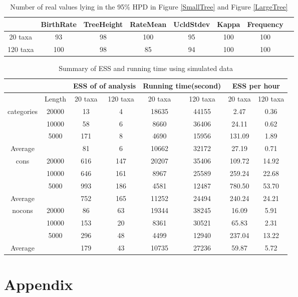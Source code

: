 \documentclass{bmcart}
\begin{document}
\begin{backmatter}
\begin{table}[h!]
  \centering
\begin{tabular}{cccccccc}
\hline
&BirthRate&TreeHeight&RateMean&UcldStdev&Kappa&Frequency\\
\hline
20 taxa&93&98&100&95&100&100\\
120 taxa&100&98&85&94&100&100\\
\hline
\end{tabular}
\caption{Number of real values lying in the 95\% HPD in Figure \ref{SmallTree} and Figure \ref{LargeTree} }\label{num_hpd}
\end{table}

\begin{table}[h!]
  \centering
\begin{tabular}{cc|cc|cc|cc}
\hline
&&\multicolumn{2}{c|}{ESS of of analysis}&\multicolumn{2}{c|}{Running time(second)}&\multicolumn{2}{c}{ESS per hour}\\
\hline
&Length&20 taxa&120 taxa&20 taxa&120 taxa&20 taxa&120 taxa\\
categories&20000&13&4&18635&44155&2.47&0.36\\
&10000&58&6&8660&36406&24.11&0.62\\
&5000&171&8&4690&15956&131.09&1.89\\
Average&&81&6&10662&32172&27.19&0.71\\
\hline
cons&20000&616&147&20207&35406&109.72&14.92\\
&10000&646&161&8967&25589&259.24&22.68\\
&5000&993&186&4581&12487&780.50&53.70\\
Average&&752&165&11252&24494&240.24&24.21\\
\hline
nocons&20000&86&63&19344&38245&16.09&5.91\\
&10000&153&20&8361&30521&65.83&2.31\\
&5000&296&48&4499&12940&237.04&13.22\\
Average&&179&43&10735&27236&59.87&5.72\\
\hline
\end{tabular}
\caption{Summary of ESS and running time using simulated data}\label{eff_comp1}
\end{table}
\clearpage
\newpage
\section*{Appendix}

\end{backmatter}
\end{document}
